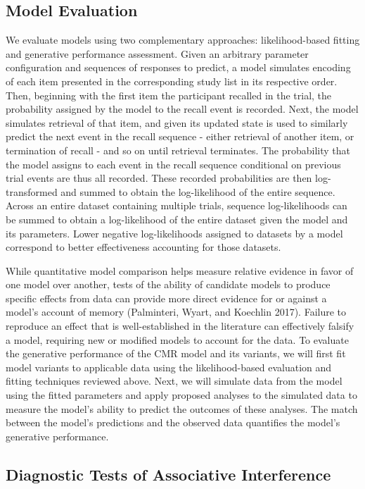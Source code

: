 \documentclass[
  letterpaper,
  11pt,
  english,
  singlespacing,
  headsepline]{MastersDoctoralThesis}
\begin{document}
\subsection{Model Evaluation}\label{model-evaluation}

We evaluate models using two complementary approaches: likelihood-based
fitting and generative performance assessment. Given an arbitrary
parameter configuration and sequences of responses to predict, a model
simulates encoding of each item presented in the corresponding study
list in its respective order. Then, beginning with the first item the
participant recalled in the trial, the probability assigned by the model
to the recall event is recorded. Next, the model simulates retrieval of
that item, and given its updated state is used to similarly predict the
next event in the recall sequence - either retrieval of another item, or
termination of recall - and so on until retrieval terminates. The
probability that the model assigns to each event in the recall sequence
conditional on previous trial events are thus all recorded. These
recorded probabilities are then log-transformed and summed to obtain the
log-likelihood of the entire sequence. Across an entire dataset
containing multiple trials, sequence log-likelihoods can be summed to
obtain a log-likelihood of the entire dataset given the model and its
parameters. Lower negative log-likelihoods assigned to datasets by a
model correspond to better effectiveness accounting for those datasets.

While quantitative model comparison helps measure relative evidence in
favor of one model over another, tests of the ability of candidate
models to produce specific effects from data can provide more direct
evidence for or against a model's account of memory (Palminteri, Wyart,
and Koechlin 2017). Failure to reproduce an effect that is
well-established in the literature can effectively falsify a model,
requiring new or modified models to account for the data. To evaluate
the generative performance of the CMR model and its variants, we will
first fit model variants to applicable data using the likelihood-based
evaluation and fitting techniques reviewed above. Next, we will simulate
data from the model using the fitted parameters and apply proposed
analyses to the simulated data to measure the model's ability to predict
the outcomes of these analyses. The match between the model's
predictions and the observed data quantifies the model's generative
performance.

\subsection{Diagnostic Tests of Associative
Interference}\label{diagnostic-tests-of-associative-interference}
\end{document}
